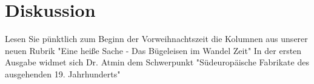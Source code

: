 \section{Diskussion}
\label{sec:Diskussion}
Lesen Sie pünktlich zum Beginn der Vorweihnachtszeit die Kolumnen aus unserer neuen Rubrik "Eine heiße Sache - Das Bügeleisen im Wandel Zeit" In der ersten Ausgabe widmet sich Dr. Atmin dem Schwerpunkt "Südeuropäische Fabrikate des ausgehenden 19. Jahrhunderts" 

